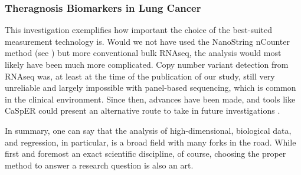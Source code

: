 \subsubsection{Theragnosis Biomarkers in Lung Cancer}
\label{subsubsec:alk}

This investigation exemplifies how important the choice of the best-suited
measurement technology is. Would we not have used the NanoString nCounter
method (see ) but more conventional bulk RNAseq, the
analysis would most likely have been much more complicated. Copy number
variant detection from RNAseq was, at least at the time of the publication of
our study, still very unreliable and largely impossible with panel-based
sequencing, which is common in the clinical environment. Since then, advances
have been made, and tools like CaSpER could present an alternative route to
take in future investigations \citep{SerinHarmanci2020}.
\bigbreak

\noindent 
In summary, one can say that the analysis of high-dimensional, biological
data, and regression, in particular, is a broad field with many forks in the
road. While first and foremost an exact scientific discipline, of course,
choosing the proper method to answer a research question is also an art.